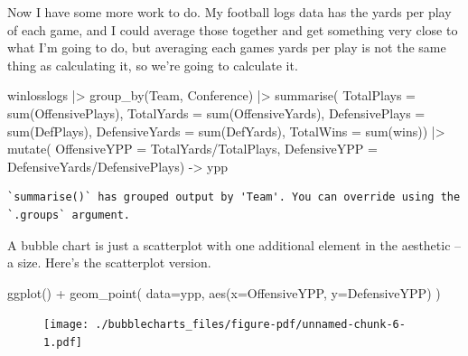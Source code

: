 \documentclass[
  letterpaper,
  DIV=11,
  numbers=noendperiod]{scrreprt}
\newenvironment{Shaded}{\begin{snugshade}}{\end{snugshade}}
\newcommand{\AttributeTok}[1]{\textcolor[rgb]{0.40,0.45,0.13}{#1}}
\newcommand{\FunctionTok}[1]{\textcolor[rgb]{0.28,0.35,0.67}{#1}}
\newcommand{\NormalTok}[1]{\textcolor[rgb]{0.00,0.23,0.31}{#1}}
\newcommand{\OtherTok}[1]{\textcolor[rgb]{0.00,0.23,0.31}{#1}}
\newcommand{\SpecialCharTok}[1]{\textcolor[rgb]{0.37,0.37,0.37}{#1}}
\begin{document}
Now I have some more work to do. My football logs data has the yards per
play of each game, and I could average those together and get something
very close to what I'm going to do, but averaging each games yards per
play is not the same thing as calculating it, so we're going to
calculate it.

\begin{Shaded}
\begin{Highlighting}[]
\NormalTok{winlosslogs }\SpecialCharTok{|\textgreater{}} 
  \FunctionTok{group\_by}\NormalTok{(Team, Conference) }\SpecialCharTok{|\textgreater{}} 
  \FunctionTok{summarise}\NormalTok{(}
    \AttributeTok{TotalPlays =} \FunctionTok{sum}\NormalTok{(OffensivePlays), }
    \AttributeTok{TotalYards =} \FunctionTok{sum}\NormalTok{(OffensiveYards), }
    \AttributeTok{DefensivePlays =} \FunctionTok{sum}\NormalTok{(DefPlays), }
    \AttributeTok{DefensiveYards =} \FunctionTok{sum}\NormalTok{(DefYards), }
    \AttributeTok{TotalWins =} \FunctionTok{sum}\NormalTok{(wins)) }\SpecialCharTok{|\textgreater{}} 
  \FunctionTok{mutate}\NormalTok{(}
    \AttributeTok{OffensiveYPP =}\NormalTok{ TotalYards}\SpecialCharTok{/}\NormalTok{TotalPlays, }
    \AttributeTok{DefensiveYPP =}\NormalTok{ DefensiveYards}\SpecialCharTok{/}\NormalTok{DefensivePlays) }\OtherTok{{-}\textgreater{}}\NormalTok{ ypp}
\end{Highlighting}
\end{Shaded}

\begin{verbatim}
`summarise()` has grouped output by 'Team'. You can override using the
`.groups` argument.
\end{verbatim}

A bubble chart is just a scatterplot with one additional element in the
aesthetic -- a size. Here's the scatterplot version.

\begin{Shaded}
\begin{Highlighting}[]
\FunctionTok{ggplot}\NormalTok{() }\SpecialCharTok{+} 
  \FunctionTok{geom\_point}\NormalTok{(}
    \AttributeTok{data=}\NormalTok{ypp, }\FunctionTok{aes}\NormalTok{(}\AttributeTok{x=}\NormalTok{OffensiveYPP, }\AttributeTok{y=}\NormalTok{DefensiveYPP)}
\NormalTok{    )}
\end{Highlighting}
\end{Shaded}

\begin{figure}[H]

{\centering \texttt{[image: ./bubblecharts\_files/figure-pdf/unnamed-chunk-6-1.pdf]}

}

\end{figure}
\end{document}
